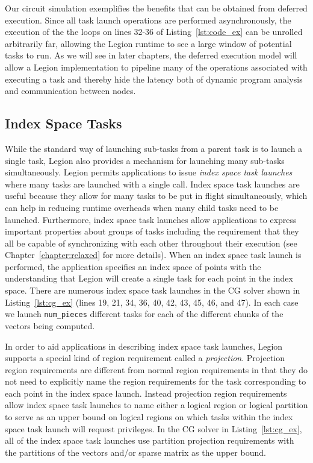 Our circuit simulation exemplifies
the benefits that can be obtained from deferred
execution. Since all task launch operations are 
performed asynchronously, the execution of the
the loops on lines 32-36 of Listing~\ref{lst:code_ex}
can be unrolled arbitrarily far, allowing the Legion 
runtime to see a large window of potential tasks to 
run. As we will see in later chapters, the deferred 
execution model will allow a Legion implementation 
to pipeline many of the operations associated with
executing a task and thereby hide the latency both
of dynamic program analysis and communication 
between nodes.

\subsection{Index Space Tasks}
\label{subsec:indextasks}
While the standard way of launching sub-tasks from
a parent task is to launch a single task, Legion
also provides a mechanism for launching many sub-tasks
simultaneously. Legion permits applications 
to issue {\em index space task launches} where many
tasks are launched with a single call. Index space
task launches are useful because they allow for many
tasks to be put in flight simultaneously, which can
help in reducing runtime overheads when many 
child tasks need to be launched. Furthermore,
index space task launches allow applications to 
express important properties about groups of 
tasks including the requirement that they all
be capable of synchronizing with each other 
throughout their execution (see
Chapter~\ref{chapter:relaxed} for more details).
When an index space task launch is performed,
the application specifies an index space of 
points with the understanding that Legion
will create a single task for each point in
the index space. There are numerous index
space task launches in the CG solver shown
in Listing~\ref{lst:cg_ex} (lines 19, 21, 34,
36, 40, 42, 43, 45, 46, and 47). In each case
we launch {\tt num\_pieces} different tasks
for each of the different chunks of the vectors
being computed.

In order to aid applications in describing index
space task launches, Legion supports a special
kind of region requirement called a {\em projection}.
Projection region requirements are different
from normal region requirements in that they
do not need to explicitly name the region
requirements for the task corresponding to 
each point in the index space launch. Instead
projection region requirements allow index
space task launches to name either a logical
region or logical partition to serve as an
upper bound on logical regions on which tasks
within the index space task launch will 
request privileges. In the CG solver in 
Listing~\ref{lst:cg_ex}, all of the index
space task launches use partition projection
requirements with the partitions of the 
vectors and/or sparse matrix as the upper
bound.

